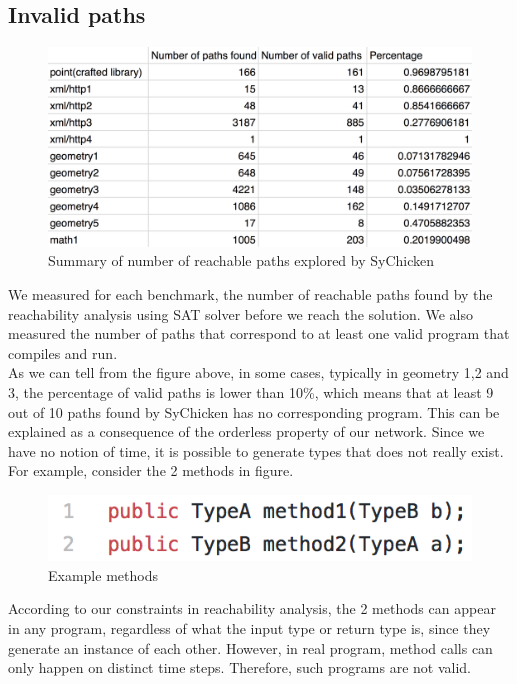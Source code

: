 \documentclass[twocolumn]{article}
\begin{document}
\subsection{Invalid paths}
\begin{figure}[h]
  \includegraphics[width = \linewidth]{data2.png}
\caption{Summary of number of reachable paths explored by SyChicken}
\end{figure}
We measured for each benchmark, the number of reachable paths found by the reachability analysis using SAT solver before we reach the solution. We also measured the number of paths that correspond to at least one valid program that compiles and run.\\
As we can tell from the figure above, in some cases, typically in geometry 1,2 and 3, the percentage of valid paths is lower than 10\%, which means that at least 9 out of 10 paths found by SyChicken has no corresponding program. This can be explained as a consequence of the orderless property of our network. Since we have no notion of time, it is possible to generate types that does not really exist. For example, consider the 2 methods in figure.\\
\begin{figure}[h]
  \includegraphics[width = \linewidth]{examplewrong.png}
\caption{Example methods}
\end{figure}
According to our constraints in reachability analysis, the 2 methods can appear in any program, regardless of what the input type or return type is, since they generate an instance of each other. However, in real program, method calls can only happen on distinct time steps. Therefore, such programs are not valid.\\
\end{document}
